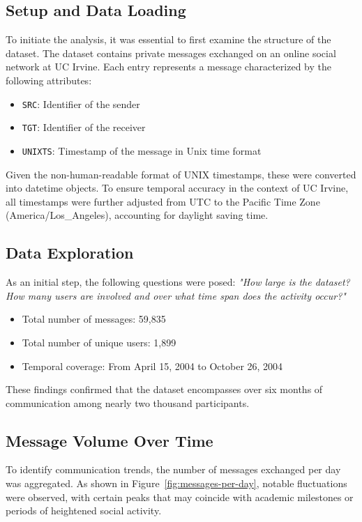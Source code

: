\subsection{Setup and Data Loading}

To initiate the analysis, it was essential to first examine the structure of the dataset. The dataset contains private messages exchanged on an online social network at UC Irvine. Each entry represents a message characterized by the following attributes:

\begin{itemize}
    \item \texttt{SRC}: Identifier of the sender
    \item \texttt{TGT}: Identifier of the receiver
    \item \texttt{UNIXTS}: Timestamp of the message in Unix time format
\end{itemize}

Given the non-human-readable format of UNIX timestamps, these were converted into datetime objects. To ensure temporal accuracy in the context of UC Irvine, all timestamps were further adjusted from UTC to the Pacific Time Zone (America/Los\_Angeles), accounting for daylight saving time.

\subsection{Data Exploration}

As an initial step, the following questions were posed: \textit{"How large is the dataset? How many users are involved and over what time span does the activity occur?"}

\begin{itemize}
    \item Total number of messages: 59,835
    \item Total number of unique users: 1,899
    \item Temporal coverage: From April 15, 2004 to October 26, 2004
\end{itemize}

These findings confirmed that the dataset encompasses over six months of communication among nearly two thousand participants.

\subsection{Message Volume Over Time}

To identify communication trends, the number of messages exchanged per day was aggregated. As shown in Figure~\ref{fig:messages-per-day}, notable fluctuations were observed, with certain peaks that may coincide with academic milestones or periods of heightened social activity.

